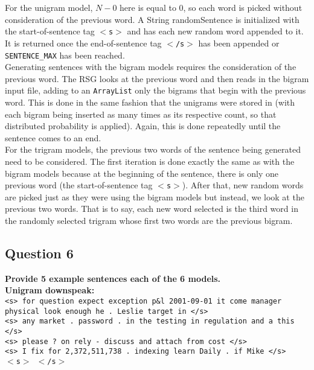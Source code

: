 \documentclass{article} %
\begin{document}
For the unigram model, $N - 0$ here is equal to 0, so each word is picked without consideration of the previous word. A String randomSentence is initialized with the start-of-sentence tag  \texttt{$<$s$>$} and has each new random word appended to it. It is returned once the end-of-sentence tag  \texttt{$<$/s$>$} has been appended or  \texttt{SENTENCE\_MAX} has been reached.\\

Generating sentences with the bigram models requires the consideration of the previous word. The RSG looks at the previous word and then reads in the bigram input file, adding to an  \texttt{ArrayList} only the bigrams that begin with the previous word. This is done in the same fashion that the unigrams were stored in (with each bigram being inserted as many times as its respective count, so that distributed probability is applied). Again, this is done repeatedly until the sentence comes to an end.\\

For the trigram models, the previous two words of the sentence being generated need to be considered. The first iteration is done exactly the same as with the bigram models because at the beginning of the sentence, there is only one previous word (the start-of-sentence tag  \texttt{$<$s$>$}). After that, new random words are picked just as they were using the bigram models but instead, we look at the previous two words. That is to say, each new word selected is the third word in the randomly selected trigram whose first two words are the previous bigram.\\


\lipsum[2] %

\subsection*{Question 6}

\textbf{Provide 5 example sentences each of the 6 models.}
\\
\textbf{Unigram downspeak:}\\

\texttt{<s> for question expect exception p\&l 2001-09-01 it come manager physical look enough he . Leslie target in </s>\\
<s> any market . password . in the testing in regulation and a this </s>\\
<s> please ? on rely - discuss and attach from cost </s>\\
<s> I fix for 2,372,511,738 . indexing learn Daily . if Mike </s>\\
$<$s$>$ $<$/s$>$}\\
\end{document}
